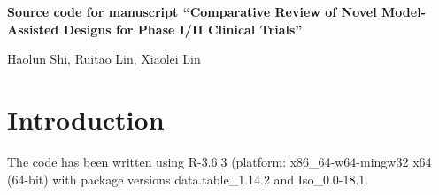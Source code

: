 \documentclass[notitlepage]{article}
\begin{document}
\begin{center}
{\bf \large
 Source code for manuscript ``Comparative Review of Novel Model-Assisted Designs for
Phase I/II Clinical Trials''
}\end{center}

\begin{center}
{
 Haolun Shi, Ruitao Lin, Xiaolei Lin
}\end{center}


\section{Introduction}
The code has been written using R-3.6.3 (platform:  x86\_64-w64-mingw32 x64 (64-bit) with
package versions data.table\_1.14.2 and Iso\_0.0-18.1.
\end{document}
